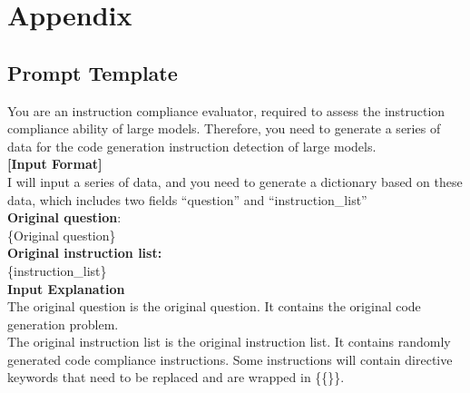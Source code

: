 \section{Appendix}
\subsection{Prompt Template} \label{appendix:prmpttemplate}

\begin{tcolorbox}[title=Prompt for Instruction Generation, label={fig:test_generation_prompt}]
You are an instruction compliance evaluator, required to assess the instruction compliance ability of large models. Therefore, you need to generate a series of data for the code generation instruction detection of large models.\\
\textbf{[Input Format]}\\
I will input a series of data, and you need to generate a dictionary based on these data, which includes two fields ``question'' and ``instruction\_list''\\
\textbf{Original question}:\\
\{Original question\}\\
\textbf{Original instruction list:}\\
\{instruction\_list\}\\
\textbf{Input Explanation}\\
The original question is the original question. It contains the original code generation problem.\\
The original instruction list is the original instruction list. It contains randomly generated code compliance instructions. Some instructions will contain directive keywords that need to be replaced and are wrapped in \{\{\}\}.


\end{tcolorbox}
